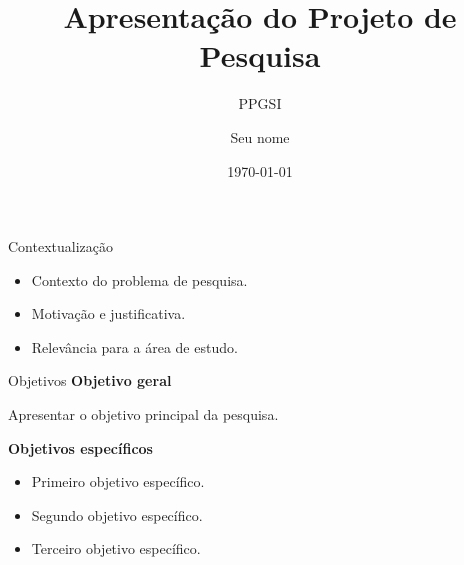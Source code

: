 \documentclass[aspectratio=169,11pt]{beamer}
\title{Apresentação do Projeto de Pesquisa}
\subtitle{PPGSI}
\author{Seu nome}
\institute{Universidade de São Paulo}
\date{\today}
\begin{document}
\begin{frame}
    \titlepage
\end{frame}

\begin{frame}{Contextualização}
    \begin{itemize}
        \item Contexto do problema de pesquisa.
        \item Motivação e justificativa.
        \item Relevância para a área de estudo.
    \end{itemize}
\end{frame}

\begin{frame}{Objetivos}
    \textbf{Objetivo geral}
    
    Apresentar o objetivo principal da pesquisa.

    \vspace{0.4cm}

    \textbf{Objetivos específicos}
    \begin{itemize}
        \item Primeiro objetivo específico.
        \item Segundo objetivo específico.
        \item Terceiro objetivo específico.
    \end{itemize}
\end{frame}
\end{document}
